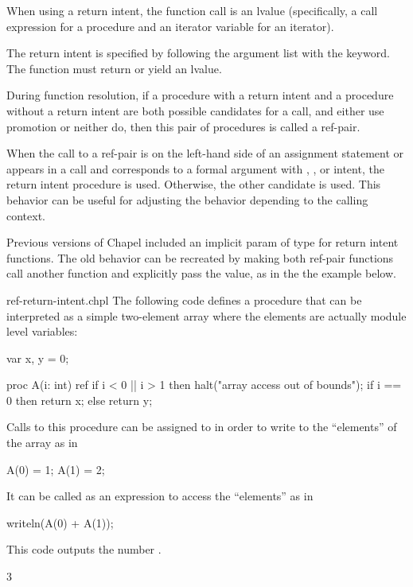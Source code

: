 When using a  return intent, the function call is an lvalue
(specifically, a call expression for a procedure and an iterator variable for
an iterator).

The  return intent is specified by following the argument list with
the  keyword.  The function must return or yield an lvalue.

During function resolution, if a procedure with a  return
intent and a procedure without a  return intent are both
possible candidates for a call, and either use promotion or neither do,
then this pair of procedures is called a ref-pair.

When the call to a ref-pair is on the left-hand side of an
assignment statement or appears in a call and corresponds to a formal argument
with , , or  intent, the  return
intent procedure is used. Otherwise, the other candidate is used.  This
behavior can be useful for adjusting the behavior depending to the
calling context.

\begin{craychapel}
Previous versions of Chapel included an implicit  param of
type  for  return intent functions. The old behavior
can be recreated by making both ref-pair functions call another function
and explicitly pass the  value, as in the the example below.
\end{craychapel}

\begin{chapelexample}{ref-return-intent.chpl}
The following code defines a procedure that can be interpreted as a
simple two-element array where the elements are actually module
level variables:
\begin{chapel}
var x, y = 0;

proc A(i: int) ref {
  if i < 0 || i > 1 then
    halt("array access out of bounds");
  if i == 0 then
    return x;
  else
    return y;
}
\end{chapel}
Calls to this procedure can be assigned to in order to write to the ``elements''
of the array as in
\begin{chapel}
A(0) = 1;
A(1) = 2;
\end{chapel}
It can be called as an expression to access the ``elements'' as in
\begin{chapel}
writeln(A(0) + A(1));
\end{chapel}
This code outputs the number .

\begin{chapeloutput}
3
\end{chapeloutput}
\end{chapelexample}

